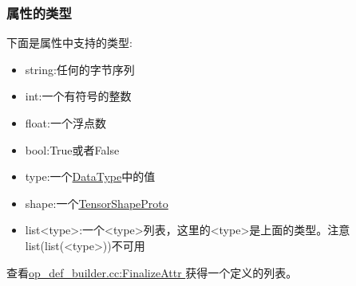 \subsubsection{属性的类型}
下面是属性中支持的类型:
\begin{itemize}
\item string:任何的字节序列
\item int:一个有符号的整数
\item float:一个浮点数
\item bool:True或者False
\item type:一个\href{https://www.github.com/tensorflow/tensorflow/blob/r1.4/tensorflow/core/framework/types.cc}{DataType}中的值
\item shape:一个\href{https://www.github.com/tensorflow/tensorflow/blob/r1.4/tensorflow/core/framework/tensor_shape.proto}{TensorShapeProto}
\item list<type>:一个<type>列表，这里的<type>是上面的类型。注意list(list(<type>))不可用
\end{itemize}
查看\href{https://www.github.com/tensorflow/tensorflow/blob/r1.4/tensorflow/core/framework/op_def_builder.cc}{op\_def\_builder.cc:FinalizeAttr }获得一个定义的列表。
